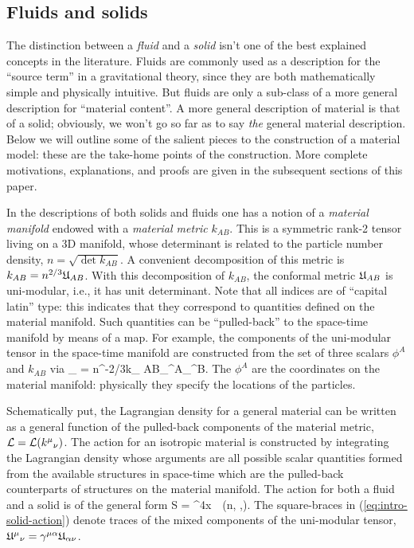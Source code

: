 \subsection{Fluids and solids}
The distinction between a \textit{fluid} and a \textit{solid} isn't one of the best explained concepts in the literature. Fluids are commonly used as a description for the ``source term'' in a gravitational theory, since they are both mathematically simple and physically intuitive. But fluids are only a sub-class of a more general description for ``material content''.  A more general  description of material is that of a solid; obviously, we won't go so far as to say \textit{the}  general material description. Below we will outline some of the salient pieces to the construction of a material model: these are the take-home points of the construction. More complete motivations, explanations, and proofs are given in the subsequent sections of this paper.

In the descriptions of both solids and fluids  one has a notion of a \textit{material manifold} endowed with a \textit{material metric} $k_{ AB}$. This is a symmetric rank-2 tensor living on a 3D manifold, whose determinant is related to the particle number density, $n = \sqrt{\det k_{ AB}}$. A convenient decomposition of this metric is $k_{ AB} = n^{2/3}\mathfrak{U}_{AB}$. With this decomposition of   $k_{ AB}$, the conformal metric $\mathfrak{U}_{AB}$ is uni-modular, i.e., it has unit determinant. Note that all indices are of ``capital latin'' type: this indicates that they correspond to quantities defined on the material manifold. Such quantities can be ``pulled-back'' to the space-time manifold by means of a map. For example, the components of the uni-modular tensor in the space-time manifold are constructed from the set of three scalars $\phi^A$  and $k_{ AB}$ via
\bea
\unimod_{\mu\nu} = n^{-2/3}k_{ AB}\partial_{\mu}\phi^A\partial_{\nu}\phi^B.
\eea
The $\phi^A$ are the coordinates on the material manifold: physically they specify the locations of the particles.

Schematically put, the Lagrangian density for a general  material  can be written as a general function of the pulled-back components of the material metric, $\mathcal{L} = \mathcal{L}({k^{\mu}}_{\nu})$. The action for an isotropic material is constructed by integrating the Lagrangian density whose arguments are all possible scalar quantities formed from the available structures in space-time which are the pulled-back counterparts of structures on the material manifold. 
The action for both a fluid and a solid is of the general form 
\bea
\label{eq:intro-solid-action}
S = \int \dd^4x\, \, \ld\left(n, \left[ \gbm{\unimod}\right],\left[\gbm{\unimod}^2\right]\right).
\eea
The square-braces in (\ref{eq:intro-solid-action}) denote traces of the mixed components of the uni-modular tensor, ${\mathfrak{U}^{\mu}}_{\nu} = \gamma^{\mu\alpha}\mathfrak{U}_{\alpha\nu}$. 

